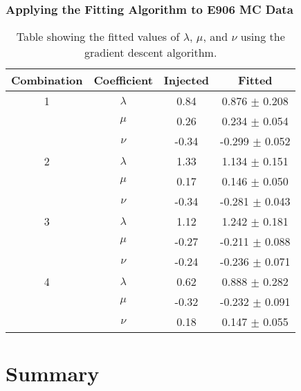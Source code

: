 \documentclass[12pt, xcolor={dvipsnames}, aspectratio = 169, sans,mathserif]{beamer}
\begin{document}
\begin{frame}
\frametitle{Applying the Fitting Algorithm to E906 MC Data}

\begin{center}
\begin{table}
\begin{tabular}{ |c| c| c| c| }
\hline
Combination & Coefficient & Injected & Fitted \\
\hline
1           & $\lambda$   & 0.84      & 0.876 $\pm$ 0.208 \\
            & $\mu$       & 0.26      & 0.234 $\pm$ 0.054 \\
            & $\nu$       & -0.34      & -0.299 $\pm$ 0.052 \\
\hline
2           & $\lambda$   & 1.33      & 1.134 $\pm$ 0.151 \\
            & $\mu$       & 0.17      & 0.146 $\pm$ 0.050 \\
            & $\nu$       & -0.34      & -0.281 $\pm$ 0.043 \\
\hline
3           & $\lambda$   & 1.12      & 1.242 $\pm$ 0.181 \\
            & $\mu$       & -0.27      & -0.211 $\pm$ 0.088 \\
            & $\nu$       & -0.24      & -0.236 $\pm$ 0.071 \\
\hline
4           & $\lambda$   & 0.62      & 0.888 $\pm$ 0.282 \\
            & $\mu$       & -0.32      & -0.232 $\pm$ 0.091 \\
            & $\nu$       & 0.18      & 0.147 $\pm$ 0.055 \\
\hline

\end{tabular}
  \caption{Table showing the fitted values of $\lambda$, $\mu$, and $\nu$ using the gradient descent algorithm.}
  \label{tabel:1}
\end{table}
\end{center}

\end{frame}

\section{Summary}
\end{document}
